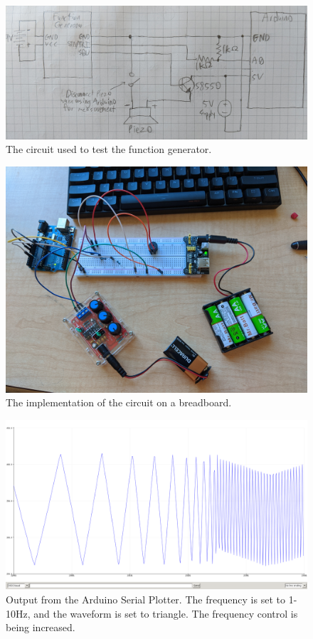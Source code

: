 \documentclass[12pt]{article}
\begin{document}
\begin{figure}[H]	
    \centering
    \includegraphics[width=\textwidth]{circuit.jpg} 
    \caption{The circuit used to test the function generator.}
    \label{fig:circuit}
\end{figure}

\begin{figure}[H]	
    \centering
    \includegraphics[width=\textwidth]{breadboard.jpg} 
    \caption{The implementation of the circuit on a breadboard.}
    \label{fig:breadboard}
\end{figure}

\begin{figure}[H]	
    \centering
    \includegraphics[width=\textwidth]{screenshot_3.png} 
    \caption{Output from the Arduino Serial Plotter. The frequency is set to 1-10Hz, and the waveform is set to
    triangle. The frequency control is being increased.}
    \label{fig:plotfreq}
\end{figure}
\end{document}
